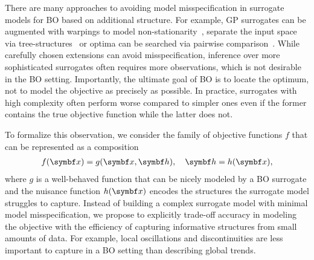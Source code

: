 There are many approaches to avoiding model misspecification in surrogate models for BO based on additional structure.
For example, GP surrogates can be augmented with warpings to model non-stationarity~\parencite{snoek_input_2014}, separate the input space via tree-structures~\parencite{jenatton_bayesian_2017} or optima can be searched via pairwise comparison~\parencite{gonzalez_preferential_2017}.
While carefully chosen extensions can avoid misspecification, inference over more sophisticated surrogates often requires more observations, which is not desirable in the BO setting.
Importantly, the ultimate goal of BO is to locate the optimum, not to model the objective as precisely as possible.
In practice, surrogates with high complexity often perform worse compared to simpler ones even if the former contains the true objective function while the latter does not.

To formalize this observation, we consider the family of objective functions $f$ that can be represented as a composition
\begin{align}
    f(\mat{x}) = g(\mat{x}, \mat{h}), \quad \mat{h}=h(\mat{x}),
\end{align}
where $g$ is a well-behaved function that can be nicely modeled by a BO surrogate and the nuisance function $h(\mat{x})$ encodes the structures the surrogate model struggles to capture.
Instead of building a complex surrogate model with minimal model misspecification, we propose to explicitly trade-off accuracy in modeling the objective with the efficiency of capturing informative structures from small amounts of data.
For example, local oscillations and discontinuities are less important to capture in a BO setting than describing global trends.

